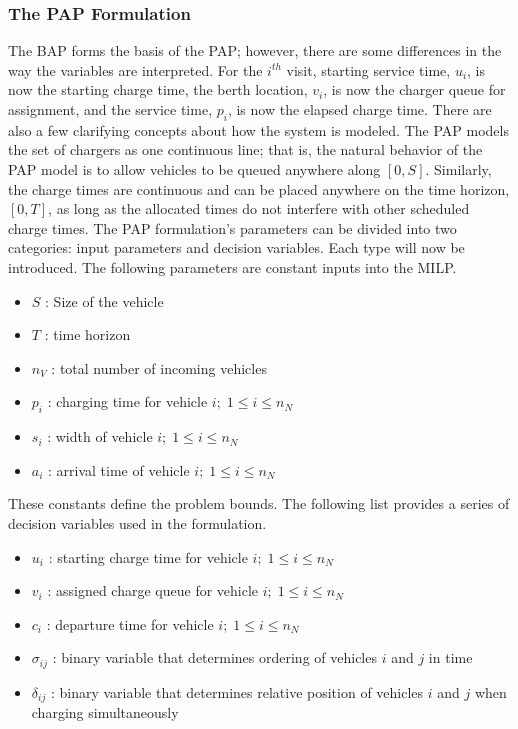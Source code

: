 \documentclass[11pt,a4paper,final]{article}
\begin{document}
\subsubsection{The PAP Formulation}
The BAP forms the basis of the PAP; however, there are some differences in the way the variables are interpreted. For the
\(i^{th}\) visit, starting service time, \(u_i\), is now the starting charge time, the berth location, \(v_i\), is now the
charger queue for assignment, and the service time, \(p_i\), is now the elapsed charge time. There are also a few clarifying concepts
about how the system is modeled. The PAP models the set of chargers as one continuous line; that is, the natural
behavior of the PAP model is to allow vehicles to be queued anywhere along \([0,S]\). Similarly, the charge times are
continuous and can be placed anywhere on the time horizon, \([0,T]\), as long as the allocated times do not interfere with
other scheduled charge times. The PAP formulation's parameters can be divided into two categories: input parameters and
decision variables. Each type will now be introduced. The following parameters are constant inputs into the MILP.

\begin{itemize}
	\item $S$   : Size of the vehicle
	\item $T$   : time horizon
	\item $n_V$ : total number of incoming vehicles
	\item $p_i$ : charging time for vehicle $i;\; 1 \leq i \leq n_N$
	\item $s_i$ : width of vehicle $i;\; 1 \leq i \leq n_N$
	\item $a_i$ : arrival time of vehicle $i;\; 1 \leq i \leq n_N$
\end{itemize}

These constants define the problem bounds. The following list provides a series of decision variables used in the
formulation.

\begin{itemize}
    \item $u_i$    : starting charge time for vehicle $i;\; 1 \leq i \leq n_N$
    \item $v_i$    : assigned charge queue for vehicle $i;\; 1 \leq i \leq n_N$
    \item $c_i$    : departure time for vehicle $i;\; 1 \leq i \leq n_N$
    \item $\sigma_{ij}$ : binary variable that determines ordering of vehicles $i$ and $j$ in time
    \item $\delta_{ij}$ : binary variable that determines relative position of vehicles $i$ and $j$ when charging simultaneously
\end{itemize}
\end{document}
